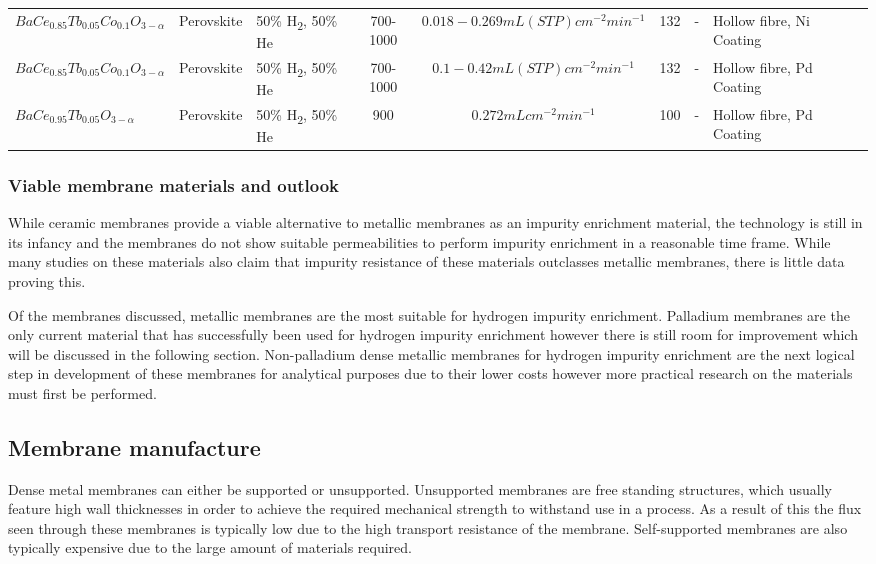 \begin{longtable}{@{}C{5cm} C{2cm} C{4cm} ccc C{6cm} C{5cm} C{0.5cm} @{}}
\\ $BaCe_{0.85}Tb_{0.05}Co_{0.1}O_{3-\alpha}	$
    & Perovskite	
    & 50\% H\textsubscript{2}, 50\% He
    & 700-1000	
    & $0.018 - 0.269 mL (STP) cm^{-2} min^{-1}	$
    & 132	
    & -	
    & Hollow fibre, Ni Coating	
    & \cite{Song2015a}

\\ $BaCe_{0.85}Tb_{0.05}Co_{0.1}O_{3-\alpha}$	
    & Perovskite	
    & 50\% H\textsubscript{2}, 50\% He
    & 700-1000	
    & $0.1 - 0.42 mL (STP) cm^{-2} min^{-1}$	
    & 132	
    & -	
    & Hollow fibre, Pd Coating	
    & \cite{Song2015a}

\\ $BaCe_{0.95}Tb_{0.05}O_{3-\alpha}$	
    & Perovskite	
    & 50\% H\textsubscript{2}, 50\% He
    & 900	
    & $0.272 mL cm^{-2} min^{-1}$	
    & 100	
    & -	
    & Hollow fibre, Pd Coating	
    & \cite{Song2015}

    
    \\ \bottomrule
    \end{longtable}

    \eject \pdfpagewidth=8.3in \pdfpageheight=11.7in


\subsubsection{Viable membrane materials and outlook}
While ceramic membranes provide a viable alternative to metallic membranes as an impurity 
enrichment material, the technology is still in its infancy and the membranes do not show 
suitable permeabilities to perform impurity enrichment in a reasonable time frame. While many 
studies on these materials also claim that impurity resistance of these materials outclasses 
metallic membranes, there is little data proving this.  

Of the membranes discussed, metallic membranes are the most suitable for hydrogen impurity 
enrichment.  Palladium membranes are the only current material that has successfully been 
used for hydrogen impurity enrichment however there is still room for improvement which will 
be discussed in the following section. Non-palladium dense metallic membranes for hydrogen 
impurity enrichment are the next logical step in development of these membranes for 
analytical purposes due to their lower costs however more practical research on the materials 
must first be performed.

\subsection{Membrane manufacture}
Dense metal membranes can either be supported or unsupported. Unsupported membranes are free 
standing structures, which usually feature high wall thicknesses in order to achieve the 
required mechanical strength to withstand use in a process. As a result of this the flux 
seen through these membranes is typically low due to the high transport resistance of the 
membrane. Self-supported membranes are also typically expensive due to the large amount of 
materials required. \cite{NathanW.Ockwig2007a}

